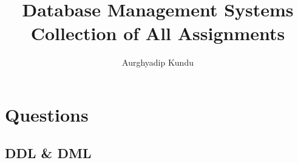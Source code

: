 \documentclass[a4paper, 11pt]{report}
\title{\Huge Database Management Systems\\
	\LARGE \textbf{Collection of All Assignments}}
\author{Aurghyadip Kundu}
\date{}
\begin{document}
	\maketitle
	\part{Questions}
	\chapter{DDL \& DML}
	
	
	
\end{document}
